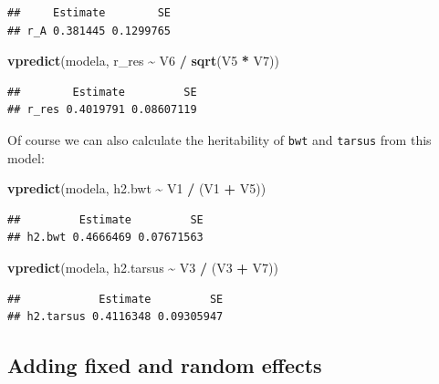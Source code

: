 \documentclass[
  12pt,
]{book}
\newenvironment{Shaded}{\begin{snugshade}}{\end{snugshade}}
\newcommand{\KeywordTok}[1]{\textcolor[rgb]{0.13,0.29,0.53}{\textbf{#1}}}
\newcommand{\NormalTok}[1]{#1}
\newcommand{\OperatorTok}[1]{\textcolor[rgb]{0.81,0.36,0.00}{\textbf{#1}}}
\newcommand{\StringTok}[1]{\textcolor[rgb]{0.31,0.60,0.02}{#1}}
\begin{document}
\begin{verbatim}
##     Estimate        SE
## r_A 0.381445 0.1299765
\end{verbatim}

\begin{Shaded}
\begin{Highlighting}[]
\KeywordTok{vpredict}\NormalTok{(modela, r\_res }\OperatorTok{\textasciitilde{}}\StringTok{ }\NormalTok{V6 }\OperatorTok{/}\StringTok{ }\KeywordTok{sqrt}\NormalTok{(V5 }\OperatorTok{*}\StringTok{ }\NormalTok{V7))}
\end{Highlighting}
\end{Shaded}

\begin{verbatim}
##        Estimate         SE
## r_res 0.4019791 0.08607119
\end{verbatim}

Of course we can also calculate the heritability of \texttt{bwt} and \texttt{tarsus} from this model:

\begin{Shaded}
\begin{Highlighting}[]
\KeywordTok{vpredict}\NormalTok{(modela, h2.bwt }\OperatorTok{\textasciitilde{}}\StringTok{ }\NormalTok{V1 }\OperatorTok{/}\StringTok{ }\NormalTok{(V1 }\OperatorTok{+}\StringTok{ }\NormalTok{V5))}
\end{Highlighting}
\end{Shaded}

\begin{verbatim}
##         Estimate         SE
## h2.bwt 0.4666469 0.07671563
\end{verbatim}

\begin{Shaded}
\begin{Highlighting}[]
\KeywordTok{vpredict}\NormalTok{(modela, h2.tarsus }\OperatorTok{\textasciitilde{}}\StringTok{ }\NormalTok{V3 }\OperatorTok{/}\StringTok{ }\NormalTok{(V3 }\OperatorTok{+}\StringTok{ }\NormalTok{V7))}
\end{Highlighting}
\end{Shaded}

\begin{verbatim}
##            Estimate         SE
## h2.tarsus 0.4116348 0.09305947
\end{verbatim}

\hypertarget{adding-fixed-and-random-effects}{%
\subsection{Adding fixed and random effects}\label{adding-fixed-and-random-effects}}
\end{document}
